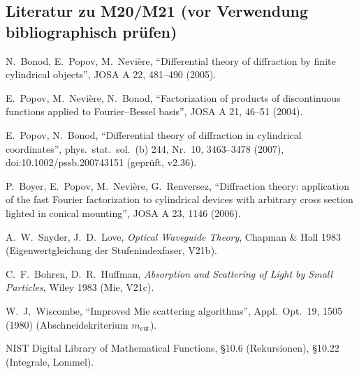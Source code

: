 \subsection*{Literatur zu M20/M21 (vor Verwendung bibliographisch prüfen)}
\begin{enumerate}[label={[\arabic*]},nosep,leftmargin=2em,start=20]
  \item N.~Bonod, E.~Popov, M.~Nevière, \enquote{Differential theory of diffraction by finite
        cylindrical objects}, JOSA A 22, 481--490 (2005).
  \item E.~Popov, M.~Nevière, N.~Bonod, \enquote{Factorization of products of discontinuous functions
        applied to Fourier--Bessel basis}, JOSA A 21, 46--51 (2004).
  \item E.~Popov, N.~Bonod, \enquote{Differential theory of diffraction in cylindrical coordinates},
        phys.\ stat.\ sol.\ (b) 244, Nr.~10, 3463--3478 (2007), doi:10.1002/pssb.200743151 (geprüft, v2.36).
  \item P.~Boyer, E.~Popov, M.~Nevière, G.~Renversez, \enquote{Diffraction theory: application of the fast Fourier
        factorization to cylindrical devices with arbitrary cross section lighted in conical mounting}, JOSA A 23, 1146 (2006).
  \item A.~W.~Snyder, J.~D.~Love, \emph{Optical Waveguide Theory}, Chapman \& Hall 1983 (Eigenwertgleichung der Stufenindexfaser, V21b).
  \item C.~F.~Bohren, D.~R.~Huffman, \emph{Absorption and Scattering of Light by Small Particles}, Wiley 1983 (Mie, V21c).
  \item W.~J.~Wiscombe, \enquote{Improved Mie scattering algorithms}, Appl.\ Opt.\ 19, 1505 (1980) (Abschneidekriterium $m_{\text{cut}}$).
  \item NIST Digital Library of Mathematical Functions, §10.6 (Rekursionen), §10.22 (Integrale, Lommel).
\end{enumerate}
